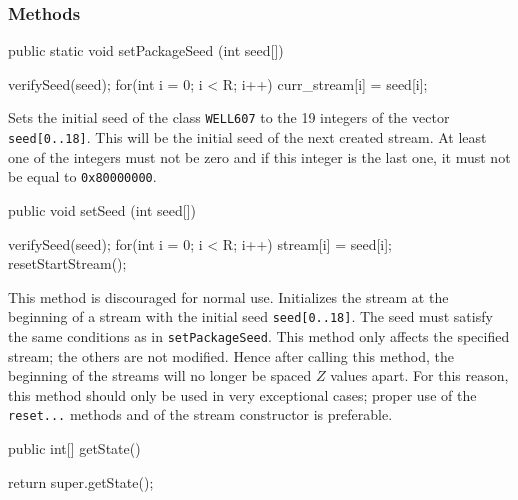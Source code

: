 \subsubsection* {Methods}
\begin{code}
   public static void setPackageSeed (int seed[]) \begin{hide} {
      verifySeed(seed);
      for(int i = 0; i < R; i++)
         curr_stream[i] = seed[i];
   } \end{hide}
\end{code}
\begin{tabb} Sets the initial seed of the class \texttt{WELL607} to the 19
  integers of the vector \texttt{seed[0..18]}.
  This will be the initial seed of the next created stream.
  At least one of the integers must not be zero and if this integer is
  the last one, it must not be equal to \texttt{0x80000000}.
\end{tabb}
\begin{htmlonly}
\end{htmlonly}
\begin{code}

   public void setSeed (int seed[]) \begin{hide} {
      verifySeed(seed);
      for(int i = 0; i < R; i++)
         stream[i] = seed[i];
      resetStartStream();
   }\end{hide}
\end{code}
\begin{tabb} This method is discouraged for normal use.
  Initializes the stream at the beginning of a stream with the initial
  seed \texttt{seed[0..18]}. The seed must satisfy the same
  conditions as in \texttt{setPackageSeed}.
  This method only affects the specified stream; the others are not 
  modified.  Hence after calling this method, the beginning of the streams
  will no longer be spaced $Z$ values apart.
  For this reason, this method should only be used in very exceptional cases; 
  proper use of the \texttt{reset...} methods and of the stream constructor is
  preferable.
\end{tabb}
\begin{htmlonly}
\end{htmlonly}
\begin{code}

   public int[] getState() \begin{hide} {
      return super.getState();
   }\end{hide}
\end{code}
